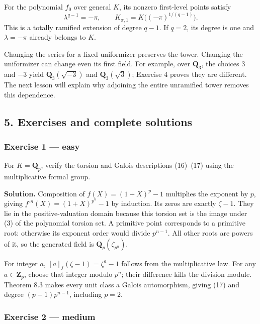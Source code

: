 \documentclass[11pt,a4paper]{article}
\begin{document}
For the polynomial \(f_0\) over general \(K\), its nonzero first-level
points satisfy \[
\lambda^{q-1}=-\pi,\qquad
K_{\pi,1}=K\bigl((-\pi)^{1/(q-1)}\bigr).
\tag{18}
\] This is a totally ramified extension of degree \(q-1\). If \(q=2\),
its degree is one and \(\lambda=-\pi\) already belongs to \(K\).

Changing the series for a fixed uniformizer preserves the tower.
Changing the uniformizer can change even its first field. For example,
over \(\mathbf Q_3\), the choices \(3\) and \(-3\) yield
\(\mathbf Q_3(\sqrt{-3})\) and \(\mathbf Q_3(\sqrt3)\); Exercise 4
proves they are different. The next lesson will explain why adjoining
the entire unramified tower removes this dependence.

\subsection{5. Exercises and complete
solutions}\label{exercises-and-complete-solutions}

\subsubsection{Exercise 1 --- easy}\label{exercise-1-easy}

For \(K=\mathbf Q_p\), verify the torsion and Galois descriptions
(16)--(17) using the multiplicative formal group.

\textbf{Solution.} Composition of \(f(X)=(1+X)^p-1\) multiplies the
exponent by \(p\), giving \(f^{\circ n}(X)=(1+X)^{p^n}-1\) by induction.
Its zeros are exactly \(\zeta-1\). They lie in the positive-valuation
domain because this torsion set is the image under (3) of the polynomial
torsion set. A primitive point corresponds to a primitive root:
otherwise its exponent order would divide \(p^{n-1}\). All other roots
are powers of it, so the generated field is
\(\mathbf Q_p(\zeta_{p^n})\).

For integer \(a\), \([a]_f(\zeta-1)=\zeta^a-1\) follows from the
multiplicative law. For any \(a\in\mathbf Z_p\), choose that integer
modulo \(p^n\); their difference kills the division module. Theorem 8.3
makes every unit class a Galois automorphism, giving (17) and degree
\((p-1)p^{n-1}\), including \(p=2\).

\subsubsection{Exercise 2 --- medium}\label{exercise-2-medium}
\end{document}
